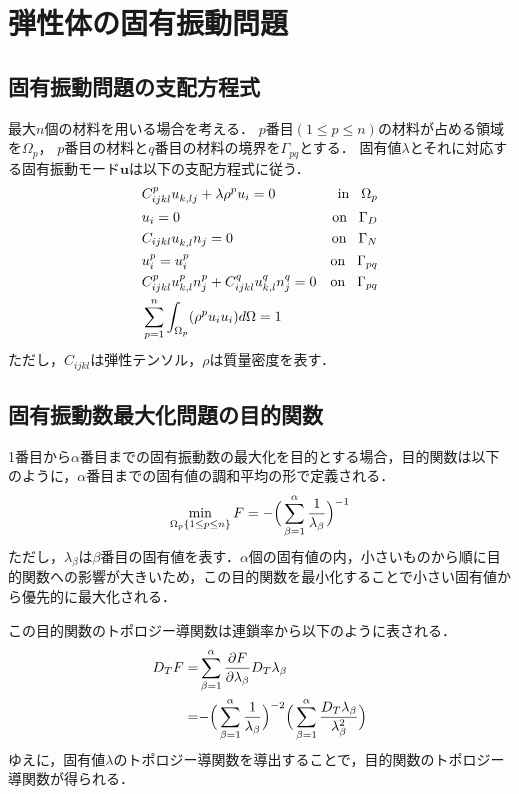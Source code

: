 \chapter{弾性体の固有振動問題}

\section{固有振動問題の支配方程式}
最大$n$個の材料を用いる場合を考える．
$p$番目$(1\leq p\leq n)$の材料が占める領域を$\Omega_{p}$，
$p$番目の材料と$q$番目の材料の境界を$\Gamma_{pq}$とする．
固有値$\lambda$とそれに対応する固有振動モード$\bm{u}$は以下の支配方程式に従う．
\begin{align}
	&C_{ijkl}^{p}u_{k,lj}^{}+\lambda\rho^{p} u_{i}=0&\text{in}\hspace{0.3cm}\Omega_{p}
	\label{eq:govmain}
	\\
	&u_{i}=0 &\text{on}\hspace{0.3cm}\Gamma_{D}
	\\
	&C_{ijkl}u_{k,l}^{}n_{j}=0 &\text{on}\hspace{0.3cm}\Gamma_{N}
	\\
	&u_{i}^{p}=u_{i}^{p} &\text{on}\hspace{0.3cm}\Gamma_{pq}
	\\
	&C_{ijkl}^{p}u_{k,l}^{p}n_{j}^{p}+C_{ijkl}^{q}u_{k,l}^{q}n_{j}^{q}=0 &\text{on}\hspace{0.3cm}\Gamma_{pq}
	\label{eq:govbc}
	\\
	&\sum_{p=1}^{n}\int_{\Omega_p}(\rho^{p}u_{i}u_{i}) d\Omega=1
	\label{eq:govnorm}
\end{align}
ただし，$C_{ijkl}$は弾性テンソル，$\rho$は質量密度を表す．

\section{固有振動数最大化問題の目的関数}

1番目から$\alpha$番目までの固有振動数の最大化を目的とする場合，目的関数は以下のように，$\alpha$番目までの固有値の調和平均の形で定義される．
\begin{align}
\min_{\Omega_{p}\{1\leq p\leq n\}}F=-\Bigr(\sum_{\beta=1}^{\alpha}\frac{1}{\lambda_{\beta}}\Bigl)^{-1}
\end{align}
ただし，$\lambda_{\beta}$は$\beta$番目の固有値を表す．$\alpha$個の固有値の内，小さいものから順に目的関数への影響が大きいため，この目的関数を最小化することで小さい固有値から優先的に最大化される．

この目的関数のトポロジー導関数は連鎖率から以下のように表される．
\begin{align}
D_{T}F	=&\sum_{\beta=1}^{\alpha}\frac{\partial F}{\partial \lambda_{\beta}}D_{T}\lambda_{\beta}
		\nonumber
		\\
		=&-\Bigr(\sum_{\beta=1}^{\alpha}\frac{1}{\lambda_{\beta}}\Bigl)^{-2}
		\Bigr(\sum_{\beta=1}^{\alpha}\frac{D_{T}\lambda_{\beta}}{\lambda_{\beta}^2}\Bigl)
\end{align}
ゆえに，固有値$\lambda$のトポロジー導関数を導出することで，目的関数のトポロジー導関数が得られる．
